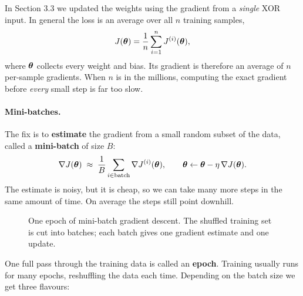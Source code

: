 \documentclass[12pt, a4paper]{article}
\begin{document}
In Section 3.3 we updated the weights using the gradient from a
\emph{single} XOR input. In general the loss is an average over all $n$
training samples,
\[
  J(\boldsymbol{\theta}) = \frac{1}{n} \sum_{i=1}^{n} J^{(i)}(\boldsymbol{\theta}),
\]
where $\boldsymbol{\theta}$ collects every weight and bias. Its gradient is therefore an
average of $n$ per-sample gradients. When $n$ is in the millions, computing
the exact gradient before \emph{every} small step is far too slow.

\paragraph{Mini-batches.}
The fix is to \textbf{estimate} the gradient from a small random subset of
the data, called a \textbf{mini-batch} of size $B$:
\[
  \nabla J(\boldsymbol{\theta}) \;\approx\; \frac{1}{B} \sum_{i \in \text{batch}}
  \nabla J^{(i)}(\boldsymbol{\theta}),
  \qquad
  \boldsymbol{\theta} \leftarrow \boldsymbol{\theta} - \eta\, \nabla J(\boldsymbol{\theta}).
\]
The estimate is noisy, but it is cheap, so we can take many more steps in the
same amount of time. On average the steps still point downhill.

\begin{figure}[H]
  \centering
  \caption{One epoch of mini-batch gradient descent. The shuffled training set
    is cut into batches; each batch gives one gradient estimate and one
    update.}
\end{figure}

One full pass through the training data is called an \textbf{epoch}.
Training usually runs for many epochs, reshuffling the data each time.
Depending on the batch size we get three flavours:
\end{document}
